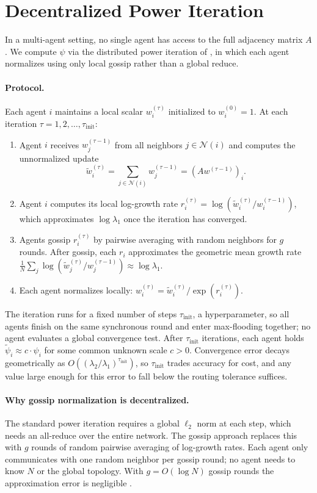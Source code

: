 \documentclass{article}
\begin{document}
\section{Decentralized Power Iteration}
\label{app:poweriter}

In a multi-agent setting, no single agent has access to the full adjacency matrix $A$. We compute $\psi$ via the distributed power iteration of \citep{jelasity2007asynchronous}, in which each agent normalizes using only local gossip rather than a global reduce.

\paragraph{Protocol.}
Each agent $i$ maintains a local scalar $w_i^{(\tau)}$ initialized to $w_i^{(0)} = 1$. At each iteration $\tau = 1, 2, \ldots, \tau_{\mathrm{init}}$:
\begin{enumerate}
    \item Agent $i$ receives $w_j^{(\tau-1)}$ from all neighbors $j \in \mathcal{N}(i)$ and computes the unnormalized update
    \[
        \tilde{w}_i^{(\tau)} = \sum_{j \in \mathcal{N}(i)} w_j^{(\tau-1)} = (Aw^{(\tau-1)})_i.
    \]
    \item Agent $i$ computes its local log-growth rate $r_i^{(\tau)} = \log(\tilde{w}_i^{(\tau)} / w_i^{(\tau-1)})$, which approximates $\log \lambda_1$ once the iteration has converged.
    \item Agents gossip $r_i^{(\tau)}$ by pairwise averaging with random neighbors for $g$ rounds. After gossip, each $r_i$ approximates the geometric mean growth rate $\frac{1}{N}\sum_j \log(\tilde{w}_j^{(\tau)} / w_j^{(\tau-1)}) \approx \log \lambda_1$.
    \item Each agent normalizes locally: $w_i^{(\tau)} = \tilde{w}_i^{(\tau)} / \exp(r_i^{(\tau)})$.
\end{enumerate}
The iteration runs for a fixed number of steps $\tau_{\mathrm{init}}$, a hyperparameter, so all agents finish on the same synchronous round and enter max-flooding together; no agent evaluates a global convergence test. After $\tau_{\mathrm{init}}$ iterations, each agent holds $\tilde{\psi}_i \approx c \cdot \psi_i$ for some common unknown scale $c > 0$. Convergence error decays geometrically as $O\!\left((\lambda_2/\lambda_1)^{\tau_{\mathrm{init}}}\right)$, so $\tau_{\mathrm{init}}$ trades accuracy for cost, and any value large enough for this error to fall below the routing tolerance suffices.

\paragraph{Why gossip normalization is decentralized.}
The standard power iteration requires a global $\ell_2$ norm at each step, which needs an all-reduce over the entire network. The gossip approach replaces this with $g$ rounds of random pairwise averaging of log-growth rates. Each agent only communicates with one random neighbor per gossip round; no agent needs to know $N$ or the global topology. With $g = O(\log N)$ gossip rounds the approximation error is negligible \citep{jelasity2007asynchronous}.
\end{document}
